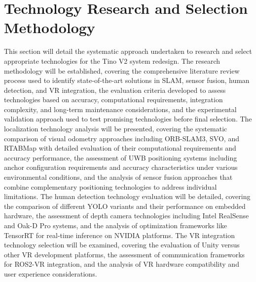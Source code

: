 \section{Technology Research and Selection Methodology}
This section will detail the systematic approach undertaken to research and select appropriate technologies for the Tino V2 system redesign. The research methodology will be established, covering the comprehensive literature review process used to identify state-of-the-art solutions in SLAM, sensor fusion, human detection, and VR integration, the evaluation criteria developed to assess technologies based on accuracy, computational requirements, integration complexity, and long-term maintenance considerations, and the experimental validation approach used to test promising technologies before final selection. The localization technology analysis will be presented, covering the systematic comparison of visual odometry approaches including ORB-SLAM3, SVO, and RTABMap with detailed evaluation of their computational requirements and accuracy performance, the assessment of UWB positioning systems including anchor configuration requirements and accuracy characteristics under various environmental conditions, and the analysis of sensor fusion approaches that combine complementary positioning technologies to address individual limitations. The human detection technology evaluation will be detailed, covering the comparison of different YOLO variants and their performance on embedded hardware, the assessment of depth camera technologies including Intel RealSense and Oak-D Pro systems, and the analysis of optimization frameworks like TensorRT for real-time inference on NVIDIA platforms. The VR integration technology selection will be examined, covering the evaluation of Unity versus other VR development platforms, the assessment of communication frameworks for ROS2-VR integration, and the analysis of VR hardware compatibility and user experience considerations.

